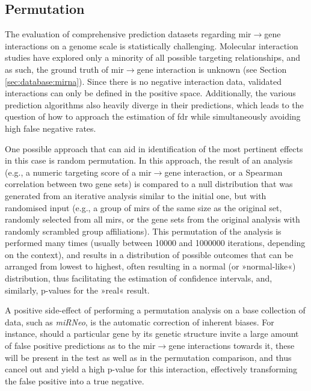 \begin{method}

\subsection{Permutation}
The evaluation of comprehensive prediction datasets regarding \ac{mir}$\to$gene interactions on a genome scale is statistically challenging. Molecular interaction studies have explored only a minority of all possible targeting relationships, and as such, the ground truth of \ac{mir}$\to$gene interaction is unknown (see Section \ref{sec:database:mirna}). Since there is no negative interaction data, validated interactions can only be defined in the positive space. Additionally, the various prediction algorithms also heavily diverge in their predictions, which leads to the question of how to approach the estimation of \acf{fdr} while simultaneously avoiding high false negative rates.

One possible approach that can aid in identification of the most pertinent effects in this case is random permutation. In this approach, the result of an analysis (e.g., a numeric targeting score of a \ac{mir}$\to$gene interaction, or a Spearman correlation between two gene sets) is compared to a null distribution that was generated from an iterative analysis similar to the initial one, but with randomised input (e.g., a group of \acp{mir} of the same size as the original set, randomly selected from all \acp{mir}, or the gene sets from the original analysis with randomly scrambled group affiliations). This permutation of the analysis is performed many times (usually between \num{10000} and \num{1000000} iterations, depending on the context), and results in a distribution of possible outcomes that can be arranged from lowest to highest, often resulting in a normal (or »normal-like«) distribution, thus facilitating the estimation of confidence intervals, and, similarly, p-values for the »real« result.

A positive side-effect of performing a permutation analysis on a base collection of data, such as \textit{miRNeo}, is the automatic correction of inherent biases. For instance, should a particular gene by its genetic structure invite a large amount of false positive predictions as to the \ac{mir}$\to$gene interactions towards it, these will be present in the test as well as in the permutation comparison, and thus cancel out and yield a high p-value for this interaction, effectively transforming the false positive into a true negative.


\end{method}
